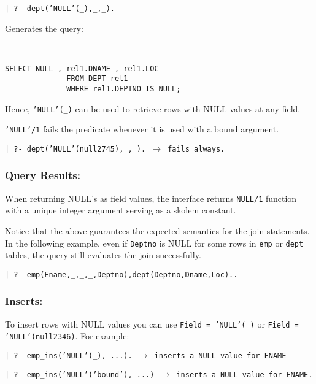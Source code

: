 \begin{center}

{\tt | ?- dept('NULL'(\_),\_,\_).}
\end{center}

Generates the query: 


\begin{verbatim}


SELECT NULL , rel1.DNAME , rel1.LOC
			  FROM DEPT rel1
			  WHERE rel1.DEPTNO IS NULL;
\end{verbatim}

Hence, {\tt 'NULL'(\_)} can be used to retrieve rows with NULL values 
at any field.

{\tt 'NULL'/1} fails the predicate whenever it is
used with a bound argument.
\begin{center}

{\tt | ?- dept('NULL'(null2745),\_,\_). $\rightarrow$ fails always.}
\end{center}


\subsubsection{Query Results:}
When returning NULL's as field values, the interface returns {\tt NULL/1} 
function with a unique integer argument serving as a skolem constant.

Notice that the above guarantees the expected semantics for the join 
statements.  In the following example, even if {\tt Deptno} is NULL for some rows in {\tt emp} or {\tt dept} tables, the query still evaluates the join successfully.
\begin{center}

{\tt | ?- emp(Ename,\_,\_,\_,Deptno),dept(Deptno,Dname,Loc)..}
\end{center}

\subsubsection{Inserts:}

To insert rows with NULL values you can use {\tt Field = 'NULL'(\_)} or
{\tt Field = 'NULL'(null2346)}.  For example:

\begin{center}

{\tt | ?- emp\_ins('NULL'(\_), ...).  $\rightarrow$ inserts a NULL value for ENAME}
\end{center}
\begin{center}

{\tt | ?- emp\_ins('NULL'('bound'), ...) $\rightarrow$ inserts a NULL value for ENAME.}

\end{center}


